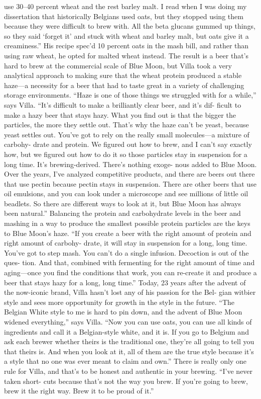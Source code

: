 \documentclass[a4paper,parskip=half]{scrartcl}
\begin{document}
use 30–40 percent wheat and the rest
barley malt. I read when I was doing my
dissertation that historically Belgians used
oats, but they stopped using them because
they were difficult to brew with. All the
beta glucans gummed up things, so they
said ‘forget it’ and stuck with wheat and
barley malt, but oats give it a creaminess.”
His recipe spec’d 10 percent oats in the
mash bill, and rather than using raw
wheat, he opted for malted wheat instead.
The result is a beer that’s hard to brew
at the commercial scale of Blue Moon,
but Villa took a very analytical approach
to making sure that the wheat protein
produced a stable haze—a necessity for a
beer that had to taste great in a variety of
challenging storage environments.
“Haze is one of those things we struggled
with for a while,” says Villa. “It’s difficult
to make a brilliantly clear beer, and it’s dif-
ficult to make a hazy beer that stays hazy.
What you find out is that the bigger the
particles, the more they settle out. That’s
why the haze can’t be yeast, because yeast
settles out. You’ve got to rely on the really
small molecules—a mixture of carbohy-
drate and protein. We figured out how to
brew, and I can’t say exactly how, but we
figured out how to do it so those particles
stay in suspension for a long time. It’s
brewing-derived. There’s nothing exoge-
nous added to Blue Moon. Over the years,
I’ve analyzed competitive products, and
there are beers out there that use pectin
because pectin stays in suspension. There
are other beers that use oil emulsions, and
you can look under a microscope and see
millions of little oil beadlets. So there are
different ways to look at it, but Blue Moon
has always been natural.”
Balancing the protein and carbohydrate
levels in the beer and mashing in a way
to produce the smallest possible protein
particles are the keys to Blue Moon’s haze.
“If you create a beer with the right amount
of protein and right amount of carbohy-
drate, it will stay in suspension for a long,
long time. You’ve got to step mash. You
can’t do a single infusion.
Decoction is out of the ques-
tion. And that, combined
with fermenting for the
right amount of time and
aging—once you find the
conditions that work, you
can re-create it and produce
a beer that stays hazy for a
long, long time.”
Today, 23 years after the
advent of the now-iconic
brand, Villa hasn’t lost any
of his passion for the Bel-
gian witbier style and sees
more opportunity for growth
in the style in the future.
“The Belgian White style to me
is hard to pin down, and the advent
of Blue Moon widened everything,” says
Villa. “Now you can use oats, you can
use all kinds of ingredients and call it a
Belgian-style white, and it is. If you go to
Belgium and ask each brewer whether
theirs is the traditional one, they’re all
going to tell you that theirs is. And when
you look at it, all of them are the true style
because it’s a style that no one was ever
meant to claim and own.”
There is really only one rule for Villa,
and that’s to be honest and authentic in
your brewing. “I’ve never taken short-
cuts because that’s not the way you
brew. If you’re going to brew,
brew it the right way. Brew
it to be proud of it.”
\end{document}
